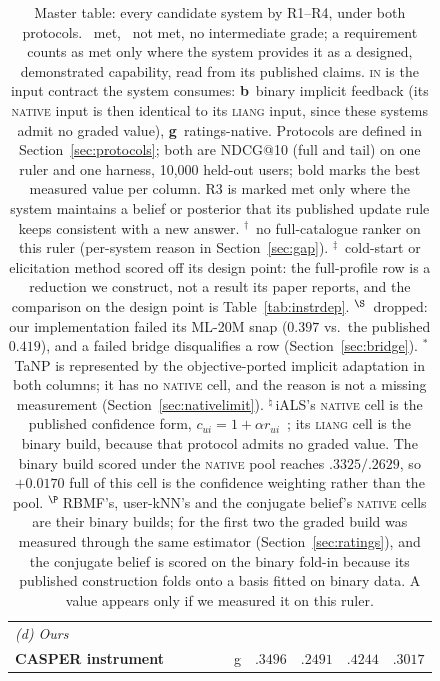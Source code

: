 \documentclass[manuscript,screen]{acmart}
\newcommand{\cmark}{\ding{51}}
\newcommand{\xmark}{\ding{55}}
\begin{document}
\begin{table}[t]
\begin{tabular}{p{4.9cm}cccc c r@{\,/\,}l r@{\,/\,}l}
\midrule
\multicolumn{10}{l}{\emph{(d) Ours}}\\
\textbf{CASPER instrument} & \cmark & \cmark & \cmark & \cmark & g & $.3496$ & $.2491$ & $.4244$ & $.3017$ \\
\bottomrule
\end{tabular}
\caption{Master table: every candidate system by R1--R4, under both protocols. \cmark~met, \xmark~not met, no intermediate grade; a requirement counts as met only where the system provides it as a designed, demonstrated capability, read from its published claims. \textsc{in} is the input contract the system consumes: \textbf{b}~binary implicit feedback (its \textsc{native} input is then identical to its \textsc{liang} input, since these systems admit no graded value), \textbf{g}~ratings-native. Protocols are defined in Section~\ref{sec:protocols}; both are NDCG@10 (full and tail) on one ruler and one harness, 10,000 held-out users; bold marks the best measured value per column. R3 is marked met only where the system maintains a belief or posterior that its published update rule keeps consistent with a new answer. $^{\dagger}$~no full-catalogue ranker on this ruler (per-system reason in Section~\ref{sec:gap}). $^{\ddagger}$~cold-start or elicitation method scored off its design point: the full-profile row is a reduction we construct, not a result its paper reports, and the comparison on the design point is Table~\ref{tab:instrdep}. $^{\S}$~dropped: our implementation failed its ML-20M snap ($0.397$ vs.\ the published $0.419$), and a failed bridge disqualifies a row (Section~\ref{sec:bridge}). $^{\ast}$\,TaNP is represented by the objective-ported implicit adaptation in both columns; it has no \textsc{native} cell, and the reason is not a missing measurement (Section~\ref{sec:nativelimit}). $^{\natural}$\,iALS's \textsc{native} cell is the published confidence form, $c_{ui}=1+\alpha r_{ui}$~\citep{hu2008collaborative}; its \textsc{liang} cell is the binary build, because that protocol admits no graded value. The binary build scored under the \textsc{native} pool reaches $.3325/.2629$, so $+0.0170$ full of this cell is the confidence weighting rather than the pool. $^{\P}$\,RBMF's, user-kNN's and the conjugate belief's \textsc{native} cells are their binary builds; for the first two the graded build was measured through the same estimator (Section~\ref{sec:ratings}), and the conjugate belief is scored on the binary fold-in because its published construction folds onto a basis fitted on binary data. A value appears only if we measured it on this ruler.}
\label{tab:master}
\end{table}
\end{document}
